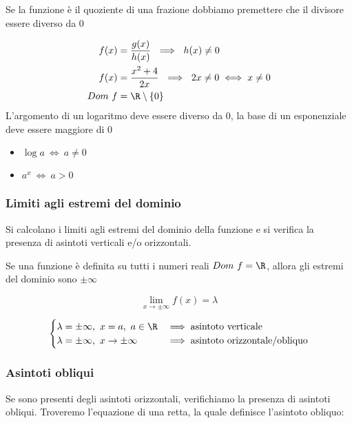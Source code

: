 \documentclass[../analisi.tex]{subfiles}
\begin{document}
\begin{esem}
Se la funzione è il quoziente di una frazione dobbiamo premettere che il divisore
 essere diverso da 0

\begin{equation}
	\begin{aligned}
		f ( x ) &= \frac{g(x)}{h(x)}\ \implies\ h(x) \neq 0\\
		f ( x ) &= \frac{x^2 + 4}{2x}\ \implies\ 2x \neq 0 \iff x \neq 0\\ 
		Dom\ f 	&= \R \setminus\{0\}
	\end{aligned}
\end{equation}
L'argomento di un logaritmo deve essere diverso da 0, la base di un esponenziale 
deve essere maggiore di 0

\begin{itemize}
	\item $ \log a\ \iff\ a \neq 0 $ 
	\item $ a^x\ \iff\ a > 0$
\end{itemize}
\end{esem}

\subsubsection{Limiti agli estremi del dominio}
Si calcolano i limiti agli estremi del dominio della funzione e si verifica 
la presenza di asintoti verticali e/o orizzontali.\\


\begin{esem}
	Se una funzione è definita su tutti i numeri reali $Dom\ f = \R $, allora
	gli estremi del dominio sono $ \pm \infty $


	\begin{equation}
		\lim_{x \to \pm\infty} f(x) = \lambda
	\end{equation}
	
	\begin{equation}
		\begin{cases}
			\lambda=\pm \infty,\ x = a,\ a \in \R & \implies
			\text{asintoto verticale}\\
			\lambda=\pm \infty,\ x \to \pm\infty & \implies
			\text{asintoto orizzontale/obliquo}\\
		\end{cases}
	\end{equation}
\end{esem}

\subsubsection{Asintoti obliqui}
Se sono presenti degli asintoti orizzontali, verifichiamo la presenza di 
asintoti obliqui. Troveremo l'equazione di una retta, la quale 
definisce l'asintoto obliquo:
\end{document}
